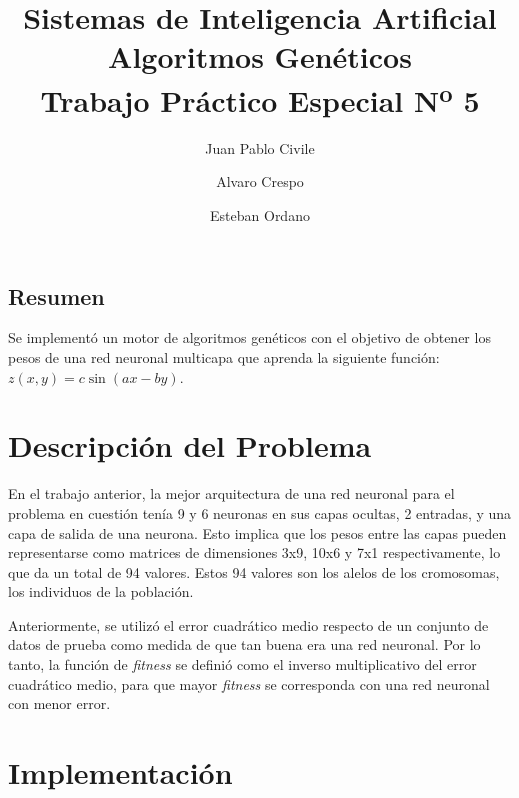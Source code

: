 \documentclass[letterpaper,twocolumn,10pt]{article}
\begin{document}
\date{}

\title{\Large Sistemas de Inteligencia Artificial \\
\Large \bf Algoritmos Genéticos \\
\Large Trabajo Práctico Especial N\textsuperscript{o} 5}

\author{
{\rm Juan Pablo Civile}
\and
{\rm Alvaro Crespo}
\and
{\rm Esteban Ordano}
}

\maketitle

\thispagestyle{empty}


\subsection*{Resumen}
Se implementó un motor de algoritmos genéticos con el objetivo de obtener los pesos de una
red neuronal multicapa que aprenda la siguiente función: $z(x, y) = c\sin(a x - b y)$.

\section{Descripción del Problema}

En el trabajo anterior, la mejor arquitectura de una red neuronal para el
problema en cuestión tenía 9 y 6 neuronas en sus capas ocultas, 2 entradas, y una capa de
salida de una neurona. Esto implica que los pesos entre las capas pueden representarse como
matrices de dimensiones 3x9, 10x6 y 7x1 respectivamente, lo que da un total de 94
valores. Estos 94 valores son los alelos de los cromosomas, los individuos de la
población.

Anteriormente, se utilizó el error cuadrático medio respecto de un conjunto de datos de prueba como medida 
de que tan buena era una red neuronal. Por lo tanto, la función de \textit{fitness} se definió como el inverso multiplicativo
del error cuadrático medio, para que mayor \textit{fitness} se corresponda con una red
neuronal con menor error.

\section{Implementación}
\end{document}
